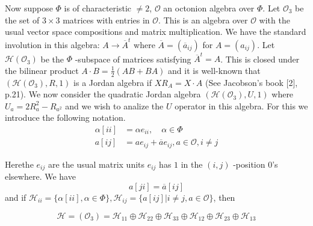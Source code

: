 Now suppose $\Phi$ is of characteristic $\neq 2$, $\mathcal{O}$ an
octonion algebra over $\Phi$. Let $\mathcal{O}_3$ be the set of
$3\times 3$ matrices with entries in $\mathcal{O}$. This is an algebra
over $\mathcal{O}$ with the usual vector space compositions and matrix
multiplication. We have the standard involution in this algebra: $A\to
\overline{A}^{t}$ where $\overline{A}=(\overline{a}_{ij})$ for
$A=(a_{ij})$. Let $\mathscr{H}(\mathcal{O}_{3})$ be the $\Phi$
-subspace of matrices satisfying $\overline{A}^{t}=A$. This is closed
under the bilinear product $A\cdot B=\frac{1}{2}(AB+BA)$ and it is
well-known that $(\mathscr{H}(\mathcal{O}_3),R,1)$ is a Jordan algebra
if $X R_A=X\cdot A$ (See Jacobson's book [2], p.21). We now consider
the quadratic Jordan algebra $(\mathscr{H}(\mathcal{O}_3),U,1)$ where
$U_a=2R^{2}_a-R_{a^{2}}$ and we wish to analize the $U$ operator in
this algebra. For this we introduce the following notation.
\begin{align*}
\alpha[ii]&=\alpha e_{ii},\quad \alpha \in \Phi\\
a[ij]&=ae_{ij}+\overline{a} e_{ij},a\in \mathcal{O}, i\neq j\tag{$29'$}
\end{align*}

Here\pageoriginale the $e_{ij}$ are the usual matrix units $e_{ij}$
has $1$ in the $(i,j)$ -position $0$'s elsewhere. We have
\begin{equation*}
a[ji]=\overline{a}[ij]\tag{$27'$}
\end{equation*}
and if $\mathscr{H}_{ii}=\{\alpha[ii],\alpha\in \Phi\},
\mathscr{H}_{ij}=\{a[ij]|i \neq j, a\in \mathcal{O}\}$, then 

\begin{equation*}
  \mathscr{H}=(\mathcal{O}_3)=\mathscr{H}_{11}\oplus
  \mathscr{H}_{22}\oplus \mathscr{H}_{33}\oplus \mathscr{H}_{12}\oplus
  \mathscr{H}_{23}\oplus \mathscr{H}_{13}\tag{28}\label{c1:eq28}
\end{equation*}

